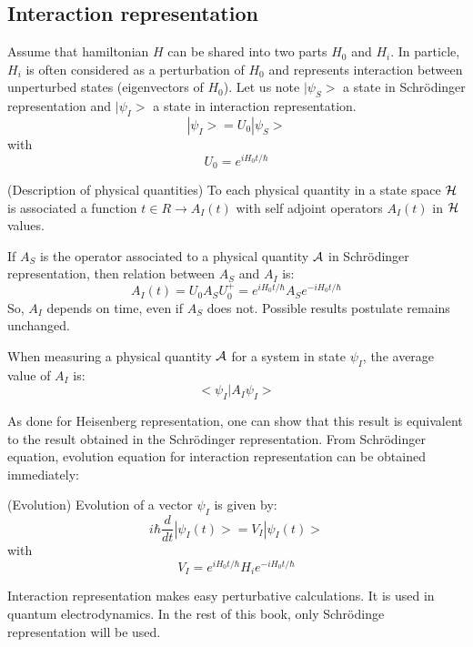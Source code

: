 \documentclass[12pt]{book}
\begin{document}
\subsection{Interaction representation}
Assume that hamiltonian $H$ can be shared into two parts $H_0$ and
$H_i$. In particle, $H_i$ is often considered as a perturbation of $H_0$ and
represents interaction between unperturbed states (eigenvectors of $H_0$).
Let us note $|\psi_S\mathrel{>} $ a state in Schr\"odinger representation and 
$|{\psi}_I\mathrel{>} $ a state in interaction 
representation.
\begin{equation}
|{\psi}_I\mathrel{>} =U_0|\psi_S\mathrel{>}
\end{equation}
with 
\begin{equation}
U_0=e^{iH_0t/\hbar}
\end{equation}
\begin{postulat}(Description of physical quantities)
To each physical quantity in a state space
${\cal H}$ is associated a function $t\in R\rightarrow A_I(t)$ with self
adjoint operators $A_I(t)$ in ${\cal H}$ values.
\end{postulat}
If $A_S$ is the operator associated to a physical quantity 
$\cal A$ in Schr\"odinger representation, then relation between $A_S$ and $A_I$ is:
\begin{equation}
A_I(t)=U_0A_SU_0^+=e^{iH_0t/\hbar}A_S e^{-iH_0t/\hbar}
\end{equation}
So, $A_I$ depends on time, even if $A_S$ does not.
Possible results postulate remains unchanged.
\begin{postulat}
When measuring a physical quantity $\cal A$ for a system in state $\psi_I$,
the average value of $A_I$ is:
\begin{equation}
<\psi_I|A_I\psi_I>
\end{equation}
\end{postulat}
As done for Heisenberg representation, one can show that this result is
equivalent to the result obtained in the
Schr\"odinger representation. From Schr\"odinger equation, evolution equation
for interaction representation can be obtained immediately:
\begin{postulat}(Evolution)
Evolution of a vector $\psi_I$ is given by:
\begin{equation}
i\hbar \frac{d}{dt} |\psi_I(t)\mathrel{>}
= V_I|\psi_I(t)\mathrel{>}  
\end{equation}
with
\begin{equation}
V_I=e^{iH_0t/\hbar}H_ie^{-iH_0t/\hbar}
\end{equation}
\end{postulat}
Interaction representation makes easy perturbative calculations. It is used in
quantum electrodynamics\cite{ph:mecaq:Cohen88}.
In the rest of this book, only Schr\"odinge representation will be used.
\end{document}
